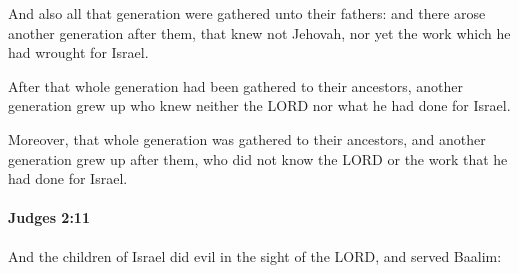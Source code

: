 			\begin{versebox}
					\item[BHS] 
					\item[ASV] And also all that generation were gathered unto their fathers: and there arose another generation after them, that knew not Jehovah, nor yet the work which he had wrought for Israel.
					\item[NIV] After that whole generation had been gathered to their ancestors, another generation grew up who knew neither the LORD nor what he had done for Israel.
					\item[NRSV] Moreover, that whole generation was gathered to their ancestors, and another generation grew up after them, who did not know the LORD or the work that he had done for Israel.
			\end{versebox}

		\paragraph{Judges 2:11} %
			\label{JUDGES-2-11}

			And the children of Israel did evil in the sight of the LORD, and served Baalim:

